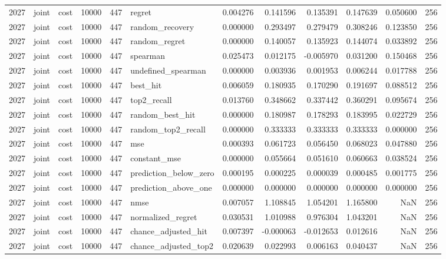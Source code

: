 \begin{tabular}{rllrrlrrrrrr}
2027 & joint & cost & 10000 & 447 & regret & 0.004276 & 0.141596 & 0.135391 & 0.147639 & 0.050600 & 256 \\
2027 & joint & cost & 10000 & 447 & random_recovery & 0.000000 & 0.293497 & 0.279479 & 0.308246 & 0.123850 & 256 \\
2027 & joint & cost & 10000 & 447 & random_regret & 0.000000 & 0.140057 & 0.135923 & 0.144074 & 0.033892 & 256 \\
2027 & joint & cost & 10000 & 447 & spearman & 0.025473 & 0.012175 & -0.005970 & 0.031200 & 0.150468 & 256 \\
2027 & joint & cost & 10000 & 447 & undefined_spearman & 0.000000 & 0.003936 & 0.001953 & 0.006244 & 0.017788 & 256 \\
2027 & joint & cost & 10000 & 447 & best_hit & 0.006059 & 0.180935 & 0.170290 & 0.191697 & 0.088512 & 256 \\
2027 & joint & cost & 10000 & 447 & top2_recall & 0.013760 & 0.348662 & 0.337442 & 0.360291 & 0.095674 & 256 \\
2027 & joint & cost & 10000 & 447 & random_best_hit & 0.000000 & 0.180987 & 0.178293 & 0.183995 & 0.022729 & 256 \\
2027 & joint & cost & 10000 & 447 & random_top2_recall & 0.000000 & 0.333333 & 0.333333 & 0.333333 & 0.000000 & 256 \\
2027 & joint & cost & 10000 & 447 & mse & 0.000393 & 0.061723 & 0.056450 & 0.068023 & 0.047880 & 256 \\
2027 & joint & cost & 10000 & 447 & constant_mse & 0.000000 & 0.055664 & 0.051610 & 0.060663 & 0.038524 & 256 \\
2027 & joint & cost & 10000 & 447 & prediction_below_zero & 0.000195 & 0.000225 & 0.000039 & 0.000485 & 0.001775 & 256 \\
2027 & joint & cost & 10000 & 447 & prediction_above_one & 0.000000 & 0.000000 & 0.000000 & 0.000000 & 0.000000 & 256 \\
2027 & joint & cost & 10000 & 447 & nmse & 0.007057 & 1.108845 & 1.054201 & 1.165800 & NaN & 256 \\
2027 & joint & cost & 10000 & 447 & normalized_regret & 0.030531 & 1.010988 & 0.976304 & 1.043201 & NaN & 256 \\
2027 & joint & cost & 10000 & 447 & chance_adjusted_hit & 0.007397 & -0.000063 & -0.012653 & 0.012616 & NaN & 256 \\
2027 & joint & cost & 10000 & 447 & chance_adjusted_top2 & 0.020639 & 0.022993 & 0.006163 & 0.040437 & NaN & 256 \\

\end{tabular}
